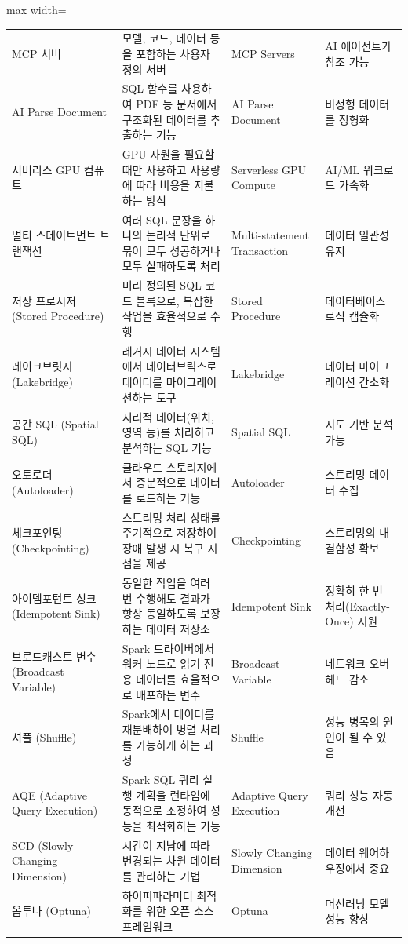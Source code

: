 \documentclass[11pt,a4paper]{article}
\begin{document}
\begin{adjustbox}{max width=\textwidth}
\begin{tabular}{llll}
MCP 서버 & 모델, 코드, 데이터 등을 포함하는 사용자 정의 서버 & MCP Servers & AI 에이전트가 참조 가능 \\
AI Parse Document & SQL 함수를 사용하여 PDF 등 문서에서 구조화된 데이터를 추출하는 기능 & AI Parse Document & 비정형 데이터를 정형화 \\
서버리스 GPU 컴퓨트 & GPU 자원을 필요할 때만 사용하고 사용량에 따라 비용을 지불하는 방식 & Serverless GPU Compute & AI/ML 워크로드 가속화 \\
멀티 스테이트먼트 트랜잭션 & 여러 SQL 문장을 하나의 논리적 단위로 묶어 모두 성공하거나 모두 실패하도록 처리 & Multi-statement Transaction & 데이터 일관성 유지 \\
저장 프로시저 (Stored Procedure) & 미리 정의된 SQL 코드 블록으로, 복잡한 작업을 효율적으로 수행 & Stored Procedure & 데이터베이스 로직 캡슐화 \\
레이크브릿지 (Lakebridge) & 레거시 데이터 시스템에서 데이터브릭스로 데이터를 마이그레이션하는 도구 & Lakebridge & 데이터 마이그레이션 간소화 \\
공간 SQL (Spatial SQL) & 지리적 데이터(위치, 영역 등)를 처리하고 분석하는 SQL 기능 & Spatial SQL & 지도 기반 분석 가능 \\
오토로더 (Autoloader) & 클라우드 스토리지에서 증분적으로 데이터를 로드하는 기능 & Autoloader & 스트리밍 데이터 수집 \\
체크포인팅 (Checkpointing) & 스트리밍 처리 상태를 주기적으로 저장하여 장애 발생 시 복구 지점을 제공 & Checkpointing & 스트리밍의 내결함성 확보 \\
아이뎀포턴트 싱크 (Idempotent Sink) & 동일한 작업을 여러 번 수행해도 결과가 항상 동일하도록 보장하는 데이터 저장소 & Idempotent Sink & 정확히 한 번 처리(Exactly-Once) 지원 \\
브로드캐스트 변수 (Broadcast Variable) & Spark 드라이버에서 워커 노드로 읽기 전용 데이터를 효율적으로 배포하는 변수 & Broadcast Variable & 네트워크 오버헤드 감소 \\
셔플 (Shuffle) & Spark에서 데이터를 재분배하여 병렬 처리를 가능하게 하는 과정 & Shuffle & 성능 병목의 원인이 될 수 있음 \\
AQE (Adaptive Query Execution) & Spark SQL 쿼리 실행 계획을 런타임에 동적으로 조정하여 성능을 최적화하는 기능 & Adaptive Query Execution & 쿼리 성능 자동 개선 \\
SCD (Slowly Changing Dimension) & 시간이 지남에 따라 변경되는 차원 데이터를 관리하는 기법 & Slowly Changing Dimension & 데이터 웨어하우징에서 중요 \\
옵투나 (Optuna) & 하이퍼파라미터 최적화를 위한 오픈 소스 프레임워크 & Optuna & 머신러닝 모델 성능 향상 \\

\end{tabular}
\end{adjustbox}
\end{document}
